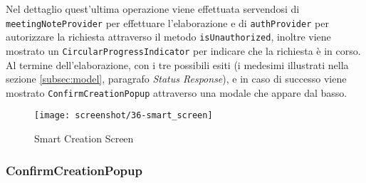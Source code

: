 Nel dettaglio quest'ultima operazione viene effettuata servendosi di \lstinline{meetingNoteProvider} per effettuare l'elaborazione e di \lstinline{authProvider} per autorizzare la richiesta attraverso il metodo \lstinline{isUnauthorized}, inoltre viene mostrato un \lstinline{CircularProgressIndicator}\cite{site:circular-progress-indicator} per indicare che la richiesta è in corso. \\
Al termine dell'elaborazione, con i tre possibili esiti (i medesimi illustrati nella sezione \ref{subsec:model}, paragrafo \emph{Status Response}), e in caso di successo viene mostrato \lstinline{ConfirmCreationPopup} attraverso una modale che appare dal basso.

\begin{figure}[!h] 
    \centering 
    \texttt{[image: screenshot/36-smart\_screen]} 
    \caption{Smart Creation Screen}
    \label{fig:smart-screen}
\end{figure}

\subsubsection*{ConfirmCreationPopup}
\label{subsubsec:confirm-creation-popup}


